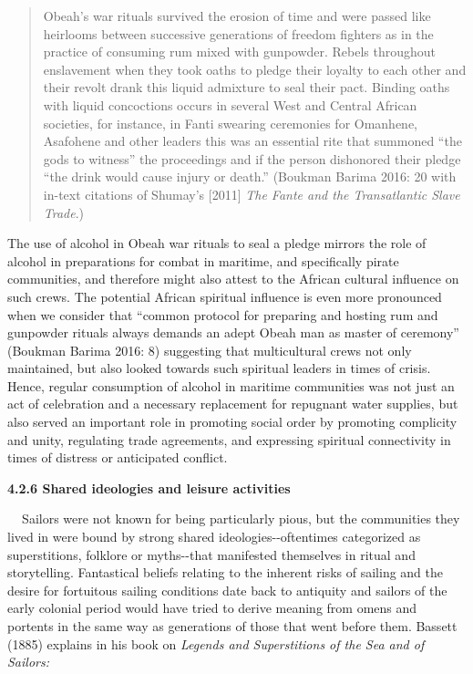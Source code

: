 \begin{quotation}
Obeah’s war rituals survived the erosion of time and were passed like heirlooms between successive generations of freedom fighters as in the practice of consuming rum mixed with gunpowder. Rebels throughout enslavement when they took oaths to pledge their loyalty to each other and their revolt drank this liquid admixture to seal their pact. Binding oaths with liquid concoctions occurs in several West and Central African societies, for instance, in Fanti swearing ceremonies for Omanhene, Asafohene and other leaders this was an essential rite that summoned “the gods to witness” the proceedings and if the person dishonored their pledge “the drink would cause injury or death.” (Boukman Barima 2016: 20 with in-text citations of Shumay’s [2011] \textit{The Fante and the Transatlantic Slave Trade}.)

\end{quotation}
\begin{styleStandard}
The use of alcohol in Obeah war rituals to seal a pledge mirrors the role of alcohol in preparations for combat in maritime, and specifically pirate communities, and therefore might also attest to the African cultural influence on such crews. The potential African spiritual influence is even more pronounced when we consider that “common protocol for preparing and hosting rum and gunpowder rituals always demands an adept Obeah man as master of ceremony” (Boukman Barima 2016: 8) suggesting that multicultural crews not only maintained, but also looked towards such spiritual leaders in times of crisis. Hence, regular consumption of alcohol in maritime communities was not just an act of celebration and a necessary replacement for repugnant water supplies, but also served an important role in promoting social order by promoting complicity and unity, regulating trade agreements, and expressing spiritual connectivity in times of distress or anticipated conflict. 
\end{styleStandard}


\begin{styleStandard}
\textbf{4.2.6 Shared ideologies and leisure activities}
\end{styleStandard}


\begin{styleStandard}
\textbf{\ \ }Sailors were not known for being particularly pious, but the communities they lived in were bound by strong shared ideologies-{}-oftentimes categorized as superstitions, folklore or myths-{}-that manifested themselves in ritual and storytelling. Fantastical beliefs relating to the inherent risks of sailing and the desire for fortuitous sailing conditions date back to antiquity and sailors of the early colonial period would have tried to derive meaning from omens and portents in the same way as generations of those that went before them. Bassett (1885) explains in his book on \textit{Legends and Superstitions of the Sea and of Sailors:}
\end{styleStandard}



